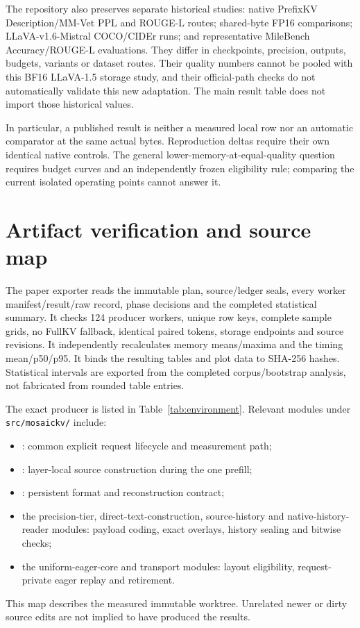 \documentclass{article}
\begin{document}
The repository also preserves separate historical studies: native
PrefixKV Description/MM-Vet PPL and ROUGE-L routes; shared-byte FP16
comparisons; LLaVA-v1.6-Mistral COCO/CIDEr runs; and representative
MileBench Accuracy/ROUGE-L evaluations. They differ in checkpoints,
precision, outputs, budgets, variants or dataset routes. Their quality
numbers cannot be pooled with this BF16 LLaVA-1.5 storage study, and their
official-path checks do not automatically validate this new adaptation.
The main result table does not import those historical values.

In particular, a published result is neither a measured local row nor an
automatic comparator at the same actual bytes. Reproduction deltas require
their own identical native controls. The general lower-memory-at-equal-quality
question requires budget curves and an independently frozen eligibility
rule; comparing the current isolated operating points cannot answer it.

\section{Artifact verification and source map}
The paper exporter reads the immutable plan, source/ledger seals, every
worker manifest/result/raw record, phase decisions and the completed
statistical summary. It checks 124 producer workers, unique row keys,
complete sample grids, no FullKV fallback, identical paired tokens,
storage endpoints and source revisions. It independently recalculates
memory means/maxima and the timing mean/p50/p95. It binds the resulting
tables and plot data to SHA-256 hashes. Statistical intervals are exported
from the completed corpus/bootstrap analysis, not fabricated from rounded
table entries.

The exact producer is listed in Table~\ref{tab:environment}. Relevant
modules under \texttt{src/mosaickv/} include:
\begin{itemize}
\item {}: common explicit
      request lifecycle and measurement path;
\item {}: layer-local
      source construction during the one prefill;
\item {}: persistent format
      and reconstruction contract;
\item the precision-tier, direct-text-construction, source-history and
      native-history-reader modules: payload coding, exact overlays,
      history sealing and bitwise checks;
\item the uniform-eager-core and transport modules: layout eligibility,
      request-private eager replay and retirement.
\end{itemize}
This map describes the measured immutable worktree. Unrelated newer or
dirty source edits are not implied to have produced the results.
\end{document}
